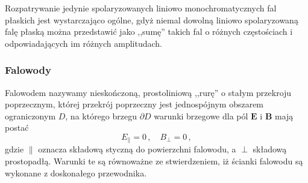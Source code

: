 \documentclass[../main.tex]{subfiles}
\begin{document}
Rozpatrywanie jedynie spolaryzowanych liniowo monochromatycznych fal płaskich jest wystarczająco
ogólne, gdyż niemal dowolną liniowo spolaryzowaną falę płaską można przedstawić jako ,,sumę'' takich
fal o różnych częstościach i odpowiadających im różnych amplitudach.

\subsubsection{Falowody}
Falowodem nazywamy nieskończoną, prostoliniową ,,rurę'' o stałym przekroju poprzecznym, której
przekrój poprzeczny jest jednospójnym obszarem ograniczonym \(D\), na którego brzegu \(\partial D\)
warunki brzegowe dla pól \(\mathbf{E}\) i \(\mathbf{B}\) mają postać
\begin{equation*}
    E_\parallel=0\,,\quad B_\perp=0\,,
\end{equation*}
gdzie \(\parallel\) oznacza składową styczną do powierzchni falowodu, a \(\perp\) składową
prostopadłą. Warunki te są równoważne ze stwierdzeniem, iż ścianki falowodu są wykonane z
doskonałego przewodnika.
\medskip
\end{document}
